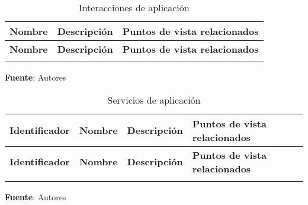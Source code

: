 \begin{center}
	\begin{longtable}{|p{4cm}|p{7cm}|p{4cm}|}
		\caption{Interacciones de aplicación \label{tab:interacciones_aplicacion}} \\
		\hline
		\textbf{Nombre} &
		\textbf{Descripción} &
		\textbf{Puntos de vista relacionados} \\
		\hline
		\endfirsthead
		\hline
		\textbf{Nombre} &
		\textbf{Descripción} &
		\textbf{Puntos de vista relacionados} \\
		\hline
		\endhead
		\hline
		\endfoot
		\hline
		\endlastfoot
	\end{longtable}
	\textbf{Fuente}: Autores
\end{center}

\begin{center}
	\begin{longtable}{|p{3cm}||p{4cm}|p{4cm}|p{4cm}|}
		\caption{Servicios de aplicación \label{tab:servicios_aplicacion}} \\
		\hline
		\textbf{Identificador} &
		\textbf{Nombre} &
		\textbf{Descripción} &
		\textbf{Puntos de vista relacionados} \\
		\hline
		\endfirsthead
		\hline
		\textbf{Identificador} &
		\textbf{Nombre} &
		\textbf{Descripción} &
		\textbf{Puntos de vista relacionados} \\
		\hline
		\endhead
		\hline
		\endfoot
		\hline
		\endlastfoot
	\end{longtable}
	\textbf{Fuente}: Autores
\end{center}